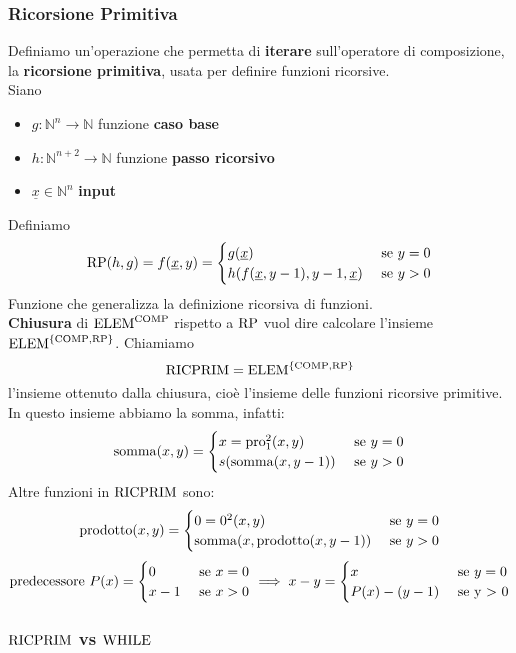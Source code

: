 \subsubsection{Ricorsione Primitiva}
Definiamo un'operazione che permetta di \textbf{iterare} sull'operatore di composizione, la \textbf{ricorsione primitiva}, usata per definire funzioni ricorsive. \\

Siano 
\begin{itemize}
	\item $g: \mathbb{N}^n \rightarrow \mathbb{N}$ funzione \textbf{caso base}
	\item $h: \mathbb{N}^{n+2} \rightarrow \mathbb{N}$ funzione \textbf{passo ricorsivo}
	\item $\underline{x} \in \mathbb{N}^n$ \textbf{input}
\end{itemize}

Definiamo
$$
\text{RP} (h,g) = f(\underline{x}, y) = \begin{cases}
	g(\underline{x}) & \text{ se } y = 0 \\
	h(f(\underline{x}, y-1), y-1, \underline{x}) & \text{ se } y > 0 \\
\end{cases}
$$
Funzione che generalizza la definizione ricorsiva di funzioni.\\

\textbf{Chiusura} di $\text{ELEM}^{\text{COMP}}$ rispetto a $\text{RP}$ vuol dire calcolare l'insieme $\text{ELEM}^{\{\text{COMP}, \text{RP}\}}$. Chiamiamo
$$ \text{RICPRIM} = \text{ELEM}^{\{\text{COMP}, \text{RP}\}} $$
l'insieme ottenuto dalla chiusura, cioè l'insieme delle funzioni ricorsive primitive.\\

In questo insieme abbiamo la somma, infatti: 
$$
\operatorname{somma}(x,y) = \begin{cases}
	x = \text{pro}_1^2 (x,y) & \text{ se } y = 0 \\
	s (\operatorname{somma}(x, y-1)) & \text{ se } y > 0 \\
\end{cases}
$$
Altre funzioni in $\text{RICPRIM}$ sono:
$$ 
\operatorname{prodotto} (x,y) = \begin{cases}
	0 = 0^2 (x,y) & \text{ se } y = 0 \\
	\operatorname{somma}(x, \operatorname{prodotto}(x, y-1)) & \text{ se } y > 0 \\
\end{cases}
$$
$$
\operatorname{predecessore} \, P(x) = \begin{cases}
	0 & \text{ se } x = 0 \\
	x-1 & \text{ se } x > 0
\end{cases}
\implies 
x-y = \begin{cases}
	x & \text{ se } y = 0 \\
	P(x) - (y-1) & \text{ se y > 0}
\end{cases}
$$

\subsubsection{$\text{RICPRIM}$ vs $\text{WHILE}$}
